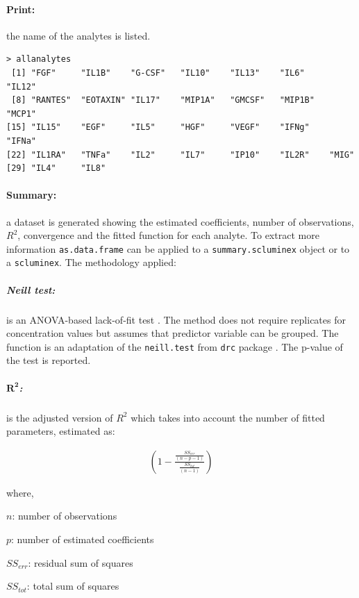 \documentclass[11pt]{article}\usepackage[]{graphicx}\usepackage[]{color}
\makeatletter
\newenvironment{kframe}{%
 \def\at@end@of@kframe{}%
 \ifinner\ifhmode%
  \def\at@end@of@kframe{\end{minipage}}%
  \begin{minipage}{\columnwidth}%
 \fi\fi%
 \def\FrameCommand##1{\hskip\@totalleftmargin \hskip-\fboxsep
 \colorbox{shadecolor}{##1}\hskip-\fboxsep
     \hskip-\linewidth \hskip-\@totalleftmargin \hskip\columnwidth}%
 \MakeFramed {\advance\hsize-\width
   \@totalleftmargin\z@ \linewidth\hsize
   \@setminipage}}%
 {\par\unskip\endMakeFramed%
 \at@end@of@kframe}
\newenvironment{knitrout}{}{} %
\newenvironment{itemize*}%
    {\begin{itemize}%
        \setlength{\itemsep}{-0.35cm}%
        \setlength{\parskip}{10pt}}%
{\end{itemize}}
\makeatother
\begin{document}
\paragraph{Print:} the name of the analytes is listed.

\begin{knitrout}
\color{fgcolor}\begin{kframe}
\begin{verbatim}
> allanalytes
 [1] "FGF"     "IL1B"    "G-CSF"   "IL10"    "IL13"    "IL6"     "IL12"   
 [8] "RANTES"  "EOTAXIN" "IL17"    "MIP1A"   "GMCSF"   "MIP1B"   "MCP1"   
[15] "IL15"    "EGF"     "IL5"     "HGF"     "VEGF"    "IFNg"    "IFNa"   
[22] "IL1RA"   "TNFa"    "IL2"     "IL7"     "IP10"    "IL2R"    "MIG"    
[29] "IL4"     "IL8"    
\end{verbatim}
\end{kframe}
\end{knitrout}

\paragraph{Summary:} a dataset is generated showing the estimated coefficients, 
number of observations, $R^2$, convergence and the fitted function for each
analyte. To extract more information {\tt as.data.frame} can be applied to a
{\tt summary.scluminex} object or to a {\tt scluminex}. The methodology applied:


\subparagraph{Neill test:} is an ANOVA-based lack-of-fit test \cite{NEILLTEST}.
The method does not require replicates for concentration values but assumes 
that predictor variable can be grouped. The function is an adaptation 
of the {\tt neill.test} from {\tt drc} package \cite{DRC}. The p-value 
of the test is reported.

\subparagraph{$ \boldsymbol{R^2}$:} is the adjusted version of $R^2$ which 
takes into account the number of fitted parameters, estimated as:

\begin{align*}
\left( 1 - \frac{\frac{SS_{err}}{(n-p-1)}}{\frac{SS_{tot}}{(n-1)}} \right)
\end{align*}

where,
\begin{itemize*}
    \item $n$: number of observations
    \item $p$: number of estimated coefficients 
    \item $SS_{err}$: residual sum of squares
    \item $SS_{tot}$: total sum of squares 
\end{itemize*}
\end{document}
